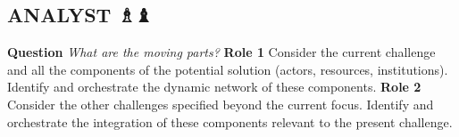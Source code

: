 \subsection*{ANALYST {\chess ♗♝} {\hfill \cognitive}}

\textbf{Question} \emph{What are the moving parts?}\newline
\textbf{Role 1} Consider the current challenge and all the components
of the potential solution (actors, resources, institutions). Identify
and orchestrate the dynamic network of these components.\newline
\textbf{Role 2} Consider the other challenges specified beyond the
current focus.  Identify and orchestrate the integration of these
components relevant to the present challenge.
